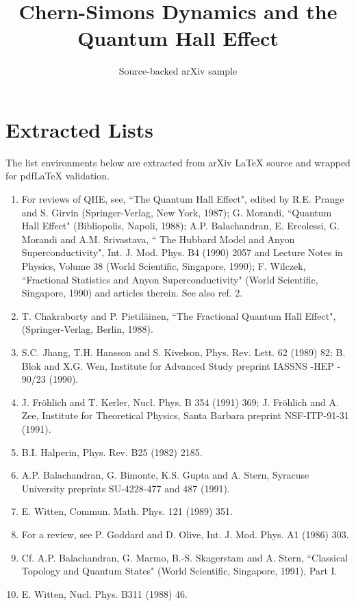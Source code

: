 \documentclass[11pt]{article}
\title{Chern-Simons Dynamics and the Quantum Hall Effect}
\author{Source-backed arXiv sample}
\date{}
\begin{document}
\maketitle
\section{Extracted Lists}

The list environments below are extracted from arXiv LaTeX source and wrapped for pdfLaTeX validation.

\begin{enumerate}

\item For reviews of QHE, see, ``The Quantum Hall Effect", edited by
R.E. Prange and S. Girvin (Springer-Verlag, New York, 1987);
G. Morandi, ``Quantum Hall Effect" (Bibliopolis, Napoli, 1988);
A.P. Balachandran, E. Ercolessi, G. Morandi and A.M. Srivastava, `` The
Hubbard Model and Anyon Superconductivity", Int. J. Mod. Phys. B4 (1990) 2057
and Lecture Notes in Physics, Volume 38 (World Scientific, Singapore, 1990);
F. Wilczek, ``Fractional Statistics and Anyon Superconductivity" (World
Scientific, Singapore, 1990) and articles therein. See also ref. 2.

\item T. Chakraborty and P. Pietil\"{a}inen, ``The Fractional
Quantum Hall Effect", (Springer-Verlag, Berlin, 1988).

\item S.C. Jhang, T.H. Hansson and S. Kivelson, Phys. Rev. Lett.
62 (1989) 82; B. Blok and X.G. Wen, Institute for Advanced Study
preprint IASSNS -HEP - 90/23 (1990).

\item J. Fr\"{o}hlich and T. Kerler, Nucl. Phys. B 354 (1991) 369;
J. Fr\"{o}hlich and A. Zee, Institute for Theoretical Physics,
Santa Barbara preprint  NSF-ITP-91-31 (1991).

\item B.I. Halperin, Phys. Rev. B25 (1982) 2185.

\item A.P. Balachandran, G. Bimonte, K.S. Gupta and A. Stern,
Syracuse University preprints SU-4228-477 and 487 (1991).

\item E. Witten, Commun. Math. Phys. 121 (1989) 351.

\item For a review, see P. Goddard and D. Olive, Int. J. Mod. Phys.
A1 (1986) 303.

\item Cf. A.P. Balachandran, G. Marmo, B.-S. Skagerstam and A. Stern,
``Classical Topology and Quantum States" (World Scientific,
Singapore, 1991), Part I.

\item E. Witten, Nucl. Phys. B311 (1988) 46.

\end{enumerate}
\end{document}
